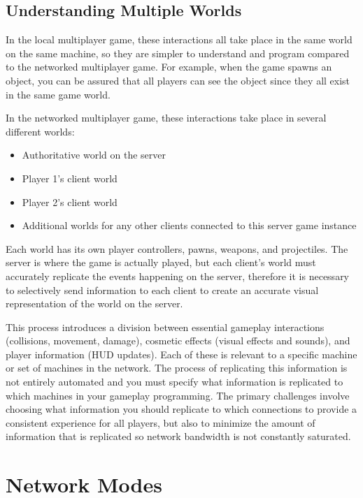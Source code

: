 \documentclass[
  letterpaper,
  DIV=11,
  numbers=noendperiod]{scrartcl}
\providecommand{\tightlist}{%
  \setlength{\itemsep}{0pt}\setlength{\parskip}{0pt}}
\begin{document}
\subsection{Understanding Multiple
Worlds}\label{understanding-multiple-worlds}

In the local multiplayer game, these interactions all take place in the
same world on the same machine, so they are simpler to understand and
program compared to the networked multiplayer game. For example, when
the game spawns an object, you can be assured that all players can see
the object since they all exist in the same game world.

In the networked multiplayer game, these interactions take place in
several different worlds:

\begin{itemize}
\tightlist
\item
  Authoritative world on the server
\item
  Player 1's client world
\item
  Player 2's client world
\item
  Additional worlds for any other clients connected to this server game
  instance
\end{itemize}

Each world has its own player controllers, pawns, weapons, and
projectiles. The server is where the game is actually played, but each
client's world must accurately replicate the events happening on the
server, therefore it is necessary to selectively send information to
each client to create an accurate visual representation of the world on
the server.

This process introduces a division between essential gameplay
interactions (collisions, movement, damage), cosmetic effects (visual
effects and sounds), and player information (HUD updates). Each of these
is relevant to a specific machine or set of machines in the network. The
process of replicating this information is not entirely automated and
you must specify what information is replicated to which machines in
your gameplay programming. The primary challenges involve choosing what
information you should replicate to which connections to provide a
consistent experience for all players, but also to minimize the amount
of information that is replicated so network bandwidth is not constantly
saturated.

\section{Network Modes}\label{network-modes}
\end{document}
